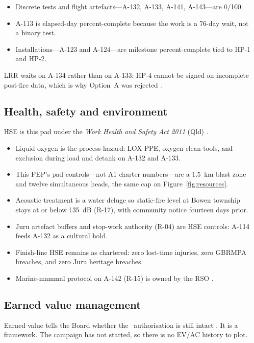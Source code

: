 \begin{itemize}[leftmargin=1.4em,itemsep=0.25em]
\item Discrete tests and flight artefacts---A-132, A-133, A-141, A-143---are 0/100.
\item A-113 is elapsed-day percent-complete because the work is a 76-day wait, not a binary test.
\item Installations---A-123 and A-124---are milestone percent-complete tied to HP-1 and HP-2.
\end{itemize}
LRR waits on A-134 rather than on A-133: HP-4 cannot be signed on incomplete post-fire data, which is why Option~A was rejected \citep{sae2016}.

\subsection{Health, safety and environment}
\label{sec:delivery-hse}

HSE is this pad under the \textit{Work Health and Safety Act 2011} (Qld) \citep{whs2011}.
\begin{itemize}[leftmargin=1.4em,itemsep=0.25em]
\item Liquid oxygen is the process hazard: LOX PPE, oxygen-clean tools, and exclusion during load and detank on A-132 and A-133.
\item This PEP's pad controls---not A1 charter numbers---are a 1.5~km blast zone and twelve simultaneous heads, the same cap on Figure~\ref{fig:resources}.
\item Acoustic treatment is a water deluge so static-fire level at Bowen township stays at or below 135~dB (R-17), with community notice fourteen days prior.
\item Juru artefact buffers and stop-work authority (R-04) are HSE controls: A-114 feeds A-132 as a cultural hold.
\item Finish-line HSE remains as chartered: zero lost-time injuries, zero GBRMPA breaches, and zero Juru heritage breaches.
\item Marine-mammal protocol on A-142 (R-15) is owned by the RSO \citep{gbrmpa2019}.
\end{itemize}

\subsection{Earned value management}
\label{sec:delivery-evm}

Earned value tells the Board whether the \PEPbac\ authorisation is still intact \citep{pmi2019evm}. It is a framework. The campaign has not started, so there is no EV/AC history to plot.

